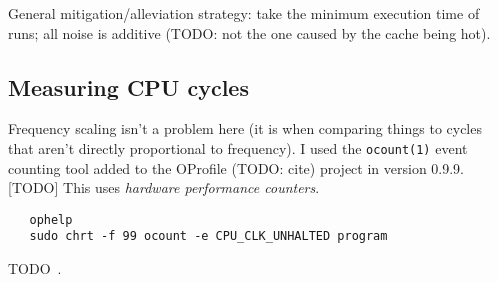 General mitigation/alleviation strategy: take the minimum execution time of  runs; all noise is additive (TODO: not the one caused by the cache being hot).

\subsection{Measuring CPU cycles}
\label{app:cycles}

Frequency scaling isn't a problem here (it is when comparing things to cycles that aren't
directly proportional to frequency).  I used the \texttt{ocount(1)} event
counting tool added to the OProfile (TODO: cite) project in version 0.9.9.  [TODO] This
uses \emph{hardware performance counters}.

\begin{verbatim}
   ophelp
   sudo chrt -f 99 ocount -e CPU_CLK_UNHALTED program
\end{verbatim}

TODO~\cite[78\psqq]{drepper2007}.



